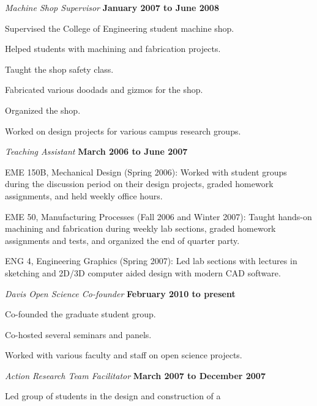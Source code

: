 \documentclass[10pt]{article}
\newenvironment{outerlist}[1][\enskip\textbullet]%
        {\begin{itemize}[#1]}{\end{itemize}%
         \vspace{-.6\baselineskip}}
\newenvironment{innerlist}[1][\enskip\textbullet]%
        {\begin{compactitem}[#1]}{\end{compactitem}}
\begin{document}
\begin{outerlist}
  \item[] \textit{Machine Shop Supervisor}%
    \hfill \textbf{January 2007 to June 2008}
  \begin{innerlist}
    \item Supervised the College of Engineering student machine shop.
    \item Helped students with machining and fabrication projects.
    \item Taught the shop safety class.
    \item Fabricated various doodads and gizmos for the shop.
    \item Organized the shop.
    \item Worked on design projects for various campus research groups.
  \end{innerlist}
  \item[] \textit{Teaching Assistant}%
    \hfill \textbf{March 2006 to June 2007}
  \begin{innerlist}
    \item EME 150B, Mechanical Design (Spring 2006): Worked with student groups
        during the discussion period on their design projects, graded homework
        assignments, and held weekly office hours.
    \item EME 50, Manufacturing Processes (Fall 2006 and Winter 2007): Taught
        hands-on machining and fabrication during weekly lab sections, graded
        homework assignments and tests, and organized the end of quarter party.
    \item ENG 4, Engineering Graphics (Spring 2007): Led lab sections with
        lectures in sketching and 2D/3D computer aided design with modern CAD
        software.
  \end{innerlist}
  \item[] \textit{Davis Open Science Co-founder}%
    \hfill \textbf{February 2010 to present}
  \begin{innerlist}
    \item Co-founded the graduate student group.
    \item Co-hosted several seminars and panels.
    \item Worked with various faculty and staff on open science projects.
  \end{innerlist}
  \item[] \textit{Action Research Team Facilitator}%
        \hfill \textbf{March 2007 to December 2007}
  \begin{innerlist}
    \item Led group of students in the design and construction of a

\end{innerlist}
\end{outerlist}
\end{document}
